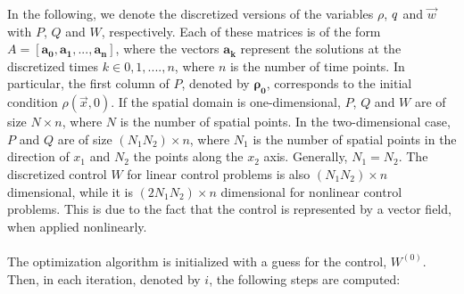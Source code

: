 In the following, we denote the discretized versions of the variables $\rho$, $q$ and $\vec{w}$ with $P$, $Q$ and $W$, respectively. Each of these matrices is of the form $A = [\boldsymbol{a_0}, \boldsymbol{a_1}, ... ,\boldsymbol{a_n}]$, where the vectors $\boldsymbol{a_k}$ represent the solutions at the discretized times $k \in 0,1,....,n$, where $n$ is the number of time points. In particular, the first column of $P$, denoted by $\boldsymbol{\rho_0}$, corresponds to the initial condition $\rho(\vec{x},0)$. If the spatial domain is one-dimensional, $P$, $Q$ and $W$ are of size $N \times n$, where $N$ is the number of spatial points. In the two-dimensional case, $P$ and $Q$ are of size $(N_1N_2) \times n$, where $N_1$ is the number of spatial points in the direction of $x_1$ and $N_2$ the points along the $x_2$ axis. Generally, $N_1 = N_2$. The discretized control $W$ for linear control problems is also $(N_1N_2) \times n$ dimensional, while it is $(2N_1N_2) \times n$ dimensional for nonlinear control problems. This is due to the fact that the control is represented by a vector field, when applied nonlinearly.
\\
\\
The optimization algorithm is initialized with a guess for the control, $W^{(0)}$. Then, in each iteration, denoted by $i$, the following steps are computed:
\vspace{0.1cm}
